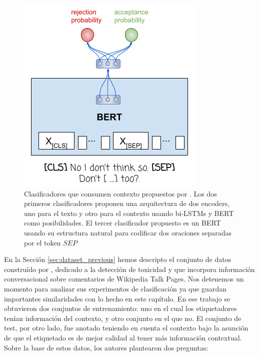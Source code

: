 \begin{figure}[t]
    \begin{minipage}[b]{0.35\textwidth}
        \includegraphics[width=\textwidth]{img/pavlopoulos_bert_sep_classifier.png}
    \end{minipage}


    \caption{Clasificadores que consumen contexto propuestos por \citet{pavlopoulos2020toxicity}. Los dos primeros clasificadores proponen una arquitectura de dos encoders, uno para el texto y otro para el contexto usando bi-LSTMs y BERT como posibilidades. El tercer clasificador propuesto es un BERT usando su estructura natural para codificar dos oraciones separadas por el token $SEP$ }
    \label{fig:pavlopoulos_classifiers}
\end{figure}


En la Sección \ref{sec:dataset_previous} hemos descripto el conjunto de datos construído por \citet{pavlopoulos2020toxicity}, dedicado a la detección de toxicidad y que incorpora información conversacional sobre comentarios de Wikipedia Talk Pages. Nos detenemos un momento para analizar sus experimentos de clasificación ya que guardan importantes similaridades con lo hecho en este capítulo. En ese trabajo se obtuvieron dos conjuntos de entrenamiento: uno en el cual los etiquetadores tenían información del contexto, y otro conjunto en el que no. El conjunto de test, por otro lado, fue anotado teniendo en cuenta el contexto bajo la asunción de que el etiquetado es de mejor calidad al tener más información contextual. Sobre la base de estos datos, los autores plantearon dos preguntas:


